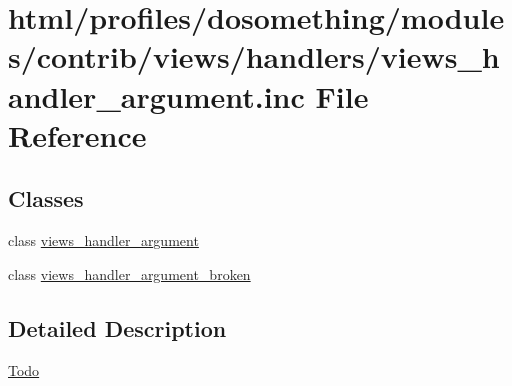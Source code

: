 \hypertarget{views__handler__argument_8inc}{
\section{html/profiles/dosomething/modules/contrib/views/handlers/views\_\-handler\_\-argument.inc File Reference}
\label{views__handler__argument_8inc}
}
\subsection*{Classes}
\begin{DoxyCompactItemize}
\item 
class \hyperlink{classviews__handler__argument}{views\_\-handler\_\-argument}
\item 
class \hyperlink{classviews__handler__argument__broken}{views\_\-handler\_\-argument\_\-broken}
\end{DoxyCompactItemize}


\subsection{Detailed Description}
\begin{Desc}
\item[\hyperlink{todo__todo000044}{Todo}]\end{Desc}
